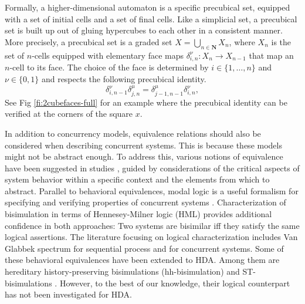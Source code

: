 \documentclass[11pt,a4paper,oldfontcommands]{memoir}
\begin{document}
Formally, a higher-dimensional automaton is a specific precubical set, equipped with a set of initial cells and a set of final cells. Like a simplicial set, a precubical set is built up out of gluing hypercubes to each other in a consistent manner. More precisely, a precubical set is a graded set $X= \bigcup_{n \in \mathbf{N}}X_n$, where $X_n$ is the set of $n$-cells equipped with elementary face maps $\delta_{ i, n}^\nu:  X_n\to X_{ n- 1}$ that map an $n$-cell to its face. The choice of the face is determined by $i\in\{ 1,\dotsc, n\}$ and $\nu\in\{ 0, 1\}$ and respects the following precubical identity.
\begin{equation*}
  \delta_{ i, n- 1}^\nu \delta_{ j, n}^\mu= \delta_{ j- 1, n- 1}^\mu
  \delta_{ i, n}^\nu,
\end{equation*}
See Fig \ref{fi:2cubefaces-full} for an example where the precubical identity can be verified at the corners of the square $x$.%

In addition to concurrency models, equivalence relations should also be considered when describing concurrent systems. This is because these models might not be abstract enough. To address this, various notions of equivalence have been suggested in studies \cite{sangiorgi1998bisimulation,van2001refinement,vanGlabbeek1997difference,gorrieri2021team,leifer2000deriving,abramsky2021relating,Uli14}, guided by considerations of the critical aspects of system behavior within a specific context and the elements from which to abstract. Parallel to behavioral equivalences, modal logic is a useful formalism for specifying and verifying properties of concurrent systems \cite{aceto2007reactive,de1989linear,pnueli1992temporal,baier2008principles,baldan2020model}. Characterization of bisimulation in terms of Hennesey-Milner logic (HML) provides additional confidence in both approaches: Two systems are bisimilar iff they satisfy the same logical assertions. The literature focusing on logical characterization includes Van Glabbek spectrum \cite{Van.br} for sequential process and \cite{baldan2010logic,nielsen1994bisimulation,de1995three,nielsen2005bisimulation,phillips2014event,baldan2014hereditary} for concurrent systems. Some of these behavioral equivalences have been extended to HDA. Among them are hereditary history-preserving bisimulations (hh-bisimulation) and ST-bisimulations \cite{VANGLABBEEK2006265}. However, to the best of our knowledge, their logical counterpart has not been investigated for HDA.
\end{document}
